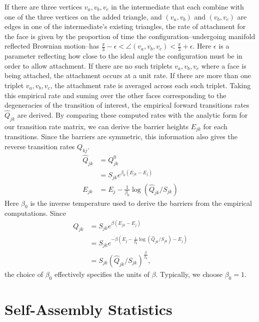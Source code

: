 If there are three vertices $v_a, v_b, v_c$ in the intermediate that each combine with one of the three vertices on the added triangle, and $(v_a, v_b)$ and $(v_b, v_c)$ are edges in one of the intermediate's existing triangles, the rate of attachment for the face is given by the proportion of time the configuration--undergoing manifold reflected Brownian motion--has $\frac{\pi}{3} - \epsilon < \angle( v_a, v_b, v_c) < \frac{\pi}{3} + \epsilon$. Here $\epsilon$ is a parameter reflecting how close to the ideal angle the configuration must be in order to allow attachment. If there are no such triplets $v_a, v_b, v_c$ where a face is being attached, the attachment occurs at a unit rate. If there are more than one triplet $v_a, v_b, v_c$, the attachment rate is averaged across each such triplet. Taking this empirical rate and suming over the other faces corresponding to the degeneracies of the transition of interest, the empirical forward transitions rates $\hat{Q}_{jk}$ are derived. By comparing these computed rates with the analytic form for our transition rate matrix, we can derive the barrier heights $E_{jk}$ for each transitions. Since the barriers are symmetric, this information also gives the reverse transition rates $Q_{kj}$.
\begin{align}
\hat{Q}_{jk} &= Q^0_{jk} \\
	&= S_{jk}e^{\beta_0(E_{jk} - E_j)} \\
E_{jk} &= E_j-\frac{1}{\beta_0}\log\left(\hat{Q}_{jk}/S_{jk}\right)
\end{align}
Here $\beta_0$ is the inverse temperature used to derive the barriers from the empirical computations. Since 
\begin{align}
Q_{jk} 	&= S_{jk}e^{\beta(E_{jk} - E_j)} \\
 &= S_{jk} e^{-\beta\left(E_j-\frac{1}{\beta_0}\log\left(\hat{Q}_{jk}/S_{jk}\right) - E_j\right)} \\
 &= S_{jk}\left(\hat{Q}_{jk}/S_{jk}\right)^{\frac{\beta}{\beta_0}},
\end{align}
the choice of $\beta_0$ effectively specifies the units of $\beta$. Typically, we choose $\beta_0 = 1$.

\section{Self-Assembly Statistics}



